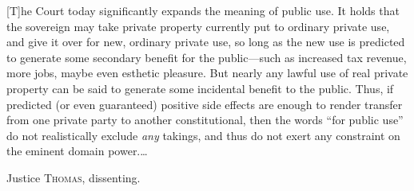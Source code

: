 [T]he Court today significantly expands the meaning of public use.
It holds that the sovereign may take private property currently put to ordinary
private use, and give it over for new, ordinary private use, so long as the new
use is predicted to generate some secondary benefit for the public---such as
increased tax revenue, more jobs, maybe even esthetic pleasure. But nearly any
lawful use of real private property can be said to generate some incidental
benefit to the public. Thus, if predicted (or even guaranteed) positive side
effects are enough to render transfer from one private party to another
constitutional, then the words ``for public use'' do not realistically exclude
\textit{any} takings, and thus do not exert any constraint on the eminent domain
power.\ldots

\opinion Justice \textsc{Thomas}, dissenting.

%

